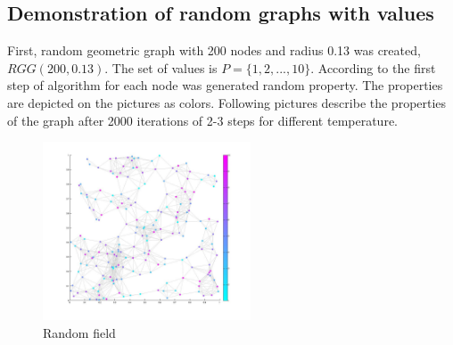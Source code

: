 \documentclass[12pt]{report}
\begin{document}
\subsection{Demonstration of random graphs with values}

First, random geometric graph with 200 nodes and radius 0.13 was created, $RGG(200, 0.13)$. The set of values is $P = \lbrace 1, 2, ..., 10 \rbrace$. According to the first step of algorithm for each node was generated random property. The properties are depicted on the pictures as colors. Following pictures describe the properties of the graph after 2000 iterations of 2-3 steps for different temperature.

\begin{figure}[h]
    \centering
    \includegraphics[height=200px]{randomfield}
    \caption{Random field}
\end{figure}
\end{document}
